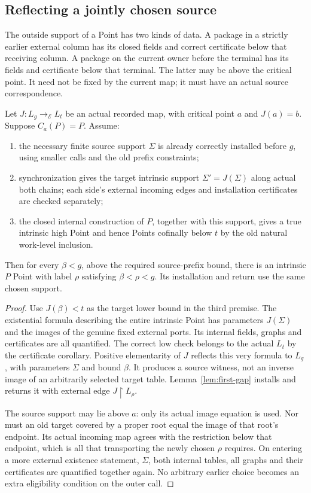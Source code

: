 \subsection{Reflecting a jointly chosen source}\label{sec:common-source}
The outside support of a Point has two kinds of data. A package in a
strictly earlier external column has its closed fields and correct
certificate below that receiving column. A package on the current
owner before the terminal has its fields and certificate below that
terminal. The latter may be above the critical point. It need not be
fixed by the current map; it must have an actual source correspondence.

\begin{proposition}\label{prop:common-source}
Let $J:L_g\to_{\mathcal E}L_t$ be an actual recorded map, with critical
point $a$ and $J(a)=b$. Suppose $C_a(P)=P$. Assume:
\begin{enumerate}
\item the necessary finite source support $\Sigma$ is already correctly
installed before $g$, using smaller calls and the old prefix constraints;
\item synchronization gives the target intrinsic support
$\Sigma'=J(\Sigma)$ along actual both chains; each side's external
incoming edges and installation certificates are checked separately;
\item the closed internal construction of $P$, together with this
support, gives a true intrinsic high Point and hence Points cofinally
below $t$ by the old natural work-level inclusion.
\end{enumerate}
Then for every $\beta<g$, above the required source-prefix bound, there
is an intrinsic $P$ Point with label $\rho$ satisfying
$\beta<\rho<g$. Its installation and return use the same chosen support.
\end{proposition}
\begin{proof}
Use $J(\beta)<t$ as the target lower bound in the third premise.
The existential formula describing the entire intrinsic Point has
parameters $J(\Sigma)$ and the images of the genuine fixed external
ports. Its internal fields, graphs and certificates are all quantified.
The correct low check belongs to the actual $L_t$ by the certificate
corollary. Positive elementarity of $J$ reflects this very formula
to $L_g$, with parameters $\Sigma$ and bound $\beta$. It produces a
source witness, not an inverse image of an arbitrarily selected target
table. Lemma~\ref{lem:first-gap} installs and returns it with external
edge $J\restriction L_\rho$.

The source support may lie above $a$: only its actual image equation
is used. Nor must an old target covered by a proper root equal the
image of that root's endpoint. Its actual incoming map agrees with
the restriction below that endpoint, which is all that transporting
the newly chosen $\rho$ requires. On entering a more external existence
statement, $\Sigma$, both internal tables, all graphs and their
certificates are quantified together again. No arbitrary earlier
choice becomes an extra eligibility condition on the outer call.
\end{proof}

